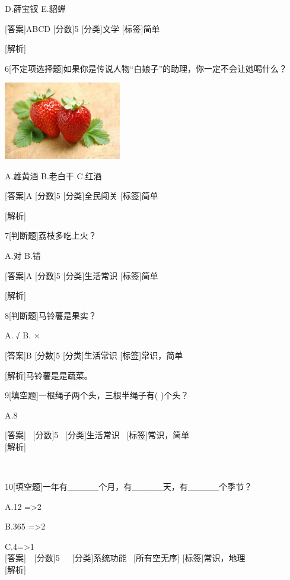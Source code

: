 D.薛宝钗 E.貂蝉

{[}答案{]}ABCD {[}分数{]}5 {[}分类{]}文学 {[}标签{]}简单

{[}解析{]}

6{[}不定项选择题{]}如果你是传说人物``白娘子''的助理，你一定不会让她喝什么？

\includegraphics[width=2.01757in,height=1.33962in]{cache/image/media/image1.jpeg}

A.雄黄酒 B.老白干 C.红酒

{[}答案{]}A {[}分数{]}5 {[}分类{]}全民闯关 {[}标签{]}简单

{[}解析{]}

7{[}判断题{]}荔枝多吃上火？

A.对 B.错

{[}答案{]}A {[}分数{]}5 {[}分类{]}生活常识 {[}标签{]}简单

{[}解析{]}

8{[}判断题{]}马铃薯是果实？

A. √ B. ×

{[}答案{]}B {[}分数{]}5 {[}分类{]}生活常识 {[}标签{]}常识，简单

{[}解析{]}马铃薯是是蔬菜。

9{[}填空题{]}一根绳子两个头，三根半绳子有( )个头？

A.8

{[}答案{]}~ {[}分数{]}5~ {[}分类{]}生活常识~ {[}标签{]}常识，简单\\
{[}解析{]}

~

10{[}填空题{]}一年有\_\_\_\_\_个月，有\_\_\_\_\_天，有\_\_\_\_\_个季节？

A.12 =\textgreater2

B.365 =\textgreater2

C.4=\textgreater1\\
{[}答案{]}~~{[}分数{]}5~~~{[}分类{]}系统功能~ {[}所有空无序{]}
{[}标签{]}常识，地理\\
{[}解析{]}~~~
